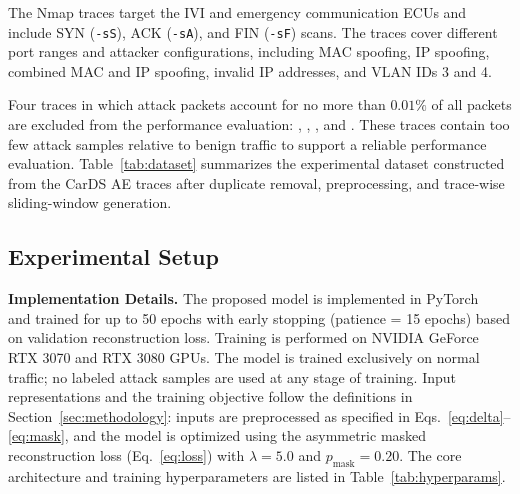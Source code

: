 The Nmap traces target the IVI and emergency communication ECUs and include SYN (\texttt{-sS}), ACK (\texttt{-sA}), and FIN (\texttt{-sF}) scans. The traces cover different port ranges and attacker configurations, including MAC spoofing, IP spoofing, combined MAC and IP spoofing, invalid IP addresses, and VLAN IDs 3 and 4.

Four traces in which attack packets account for no more than $0.01\%$ of all packets are excluded from the performance evaluation: , , , and . These traces contain too few attack samples relative to benign traffic to support a reliable performance evaluation. Table~\ref{tab:dataset} summarizes the experimental dataset constructed from the CarDS AE traces after duplicate removal, preprocessing, and trace-wise sliding-window generation.

\begin{table}[!htbp]
\centering
\caption{Statistics of the experimental dataset constructed from CarDS
AE traces after deduplication and preprocessing.}
\label{tab:dataset}
\footnotesize
{}
\end{table}

\subsection{Experimental Setup}
\label{sec:experimental_setup}
\noindent\textbf{Implementation Details.}
The proposed model is implemented in PyTorch~\cite{pytorch} and trained for up to 50 epochs with early stopping (patience = 15 epochs) based on validation reconstruction loss. Training is performed on NVIDIA GeForce RTX 3070 and RTX 3080 GPUs. The model is trained exclusively on normal traffic; no labeled attack samples are used at any stage of training. Input representations and the training objective follow the definitions in Section~\ref{sec:methodology}: inputs are preprocessed as specified in Eqs.~\eqref{eq:delta}--\eqref{eq:mask}, and the model is optimized using the asymmetric masked reconstruction loss (Eq.~\eqref{eq:loss}) with $\lambda = 5.0$ and $p_{\text{mask}} = 0.20$. The core architecture and training hyperparameters are listed in Table~\ref{tab:hyperparams}.

